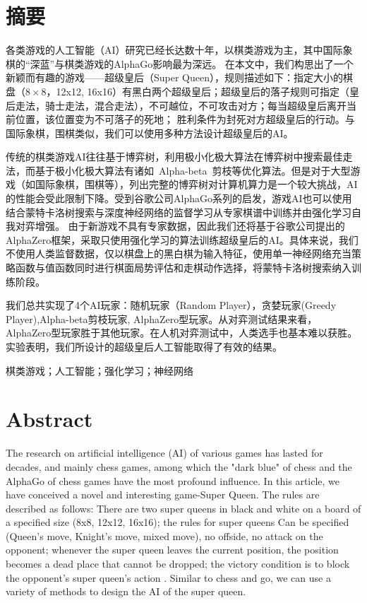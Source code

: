 \chapter*{摘要}

各类游戏的人工智能（AI）研究已经长达数十年，以棋类游戏为主，其中国际象棋的“深蓝”与棋类游戏的AlphaGo影响最为深远。
在本文中，我们构思出了一个新颖而有趣的游戏——超级皇后（Super Queen），规则描述如下：指定大小的棋盘（$8\times8$，12x12, 16x16）有黑白两个超级皇后；超级皇后的落子规则可指定（皇后走法，骑士走法，混合走法），不可越位，不可攻击对方；每当超级皇后离开当前位置，该位置变为不可落子的死地；
胜利条件为封死对方超级皇后的行动。与国际象棋，围棋类似，我们可以使用多种方法设计超级皇后的AI。


传统的棋类游戏AI往往基于博弈树，利用极小化极大算法在博弈树中搜索最佳走法，而基于极小化极大算法有诸如~Alpha-beta~剪枝等优化算法。但是对于大型游戏（如国际象棋，围棋等），列出完整的博弈树对计算机算力是一个较大挑战，AI的性能会受此限制下降。受到谷歌公司AlphaGo系列的启发，游戏AI也可以使用结合蒙特卡洛树搜索与深度神经网络的监督学习从专家棋谱中训练并由强化学习自我对弈增强。
由于新游戏不具有专家数据，因此我们还将基于谷歌公司提出的AlphaZero框架，采取只使用强化学习的算法训练超级皇后的AI。具体来说，我们不使用人类监督数据，仅以棋盘上的黑白棋为输入特征，使用单一神经网络充当策略函数与值函数同时进行棋面局势评估和走棋动作选择，将蒙特卡洛树搜索纳入训练阶段。


我们总共实现了4个AI玩家：随机玩家（Random Player），贪婪玩家(Greedy Player),Alpha-beta剪枝玩家, AlphaZero型玩家。从对弈测试结果来看，AlphaZero型玩家胜于其他玩家。在人机对弈测试中，人类选手也基本难以获胜。实验表明，我们所设计的超级皇后人工智能取得了有效的结果。

\medskip
{} 棋类游戏；人工智能；强化学习；神经网络

\chapter*{Abstract}

The research on artificial intelligence (AI) of various games has lasted for decades, and mainly chess games, among which the "dark blue" of chess and the AlphaGo of chess games have the most profound influence.
In this article, we have conceived a novel and interesting game-Super Queen. The rules are described as follows: There are two super queens in black and white on a board of a specified size (8x8, 12x12, 16x16); the rules for super queens Can be specified (Queen's move, Knight's move, mixed move), no offside, no attack on the opponent; whenever the super queen leaves the current position, the position becomes a dead place that cannot be dropped; the victory condition is to block the opponent's super queen's action . Similar to chess and go, we can use a variety of methods to design the AI of the super queen.


